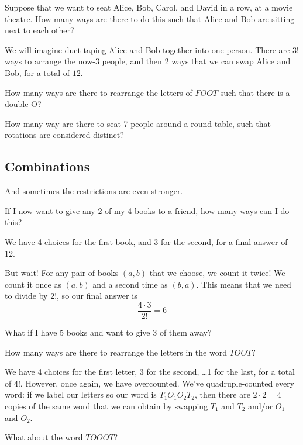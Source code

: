 \documentclass{scrartcl}
\begin{document}
	\begin{example}
		Suppose that we want to seat Alice, Bob, Carol, and David in a row, at a movie theatre. How many ways are there to do this such that Alice and Bob are sitting next to each other?
	\end{example}
	\begin{soln}
		We will imagine duct-taping Alice and Bob together into one person. There are $3!$ ways to arrange the now-3 people, and then $2$ ways that we can swap Alice and Bob, for a total of $\boxed{12}$.
	\end{soln}
	\begin{exercise}
		How many ways are there to rearrange the letters of $FOOT$ such that there is a double-O?
	\end{exercise}
	\begin{exercise}
		How many way are there to seat 7 people around a round table, such that rotations are considered distinct?
	\end{exercise}
	
	\subsection{Combinations}
	And sometimes the restrictions are even stronger.
	\begin{example}
		If I now want to give any 2 of my 4 books to a friend, how many ways can I do this?
	\end{example}
	\begin{soln}
		We have 4 choices for the first book, and 3 for the second, for a final answer of 12.

		But wait! For any pair of books $(a,b)$ that we choose, we count it twice! We count it once as $(a,b)$ and a second time as $(b,a)$. This means that we need to divide by 2!, so our final answer is 
		\[\frac{4 \cdot 3}{2!} = \boxed{6}\]
	\end{soln}
	\begin{exercise}
		What if I have 5 books and want to give 3 of them away?
	\end{exercise}

	\begin{example}
		How many ways are there to rearrange the letters in the word $TOOT$?
	\end{example}
	\begin{soln}
		We have 4 choices for the first letter, 3 for the second, \dots 1 for the last, for a total of 4!. However, once again, we have overcounted. We've quadruple-counted every word: if we label our letters so our word is $T_1O_1O_2T_2$, then there are $2 \cdot 2 = 4$ copies of the same word that we can obtain by swapping $T_1$ and $T_2$ and/or $O_1$ and $O_2$.
	\end{soln}
	\begin{exercise}
		What about the word $TOOOT$?
	\end{exercise}
\end{document}
